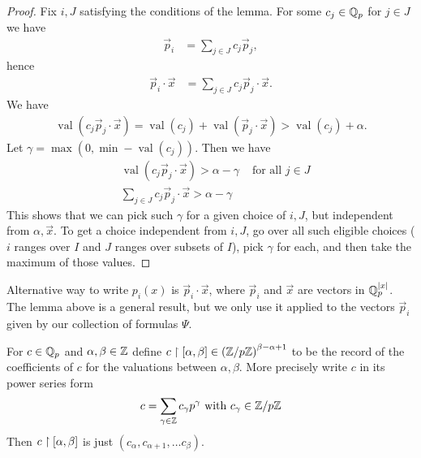 \documentclass{amsart}
\newcommand{\paren}[1]{\left(#1\right)}
\DeclareMathOperator{\val}{val}
\begin{document}
\begin{proof}
  Fix $i, J$ satisfying the conditions of the lemma.
  For some $c_j \in \mathbb{Q}_p$ for $j \in J$ we have
  \begin{align*}
    \vec p_i &= \sum_{j \in J} c_j \vec p_j,
  \end{align*}
  hence
  \begin{align*}
    \vec p_i \cdot \vec x &= \sum_{j \in J} c_j \vec p_j \cdot \vec x.
  \end{align*}
  We have
  \begin{align*}
    \val \paren{c_j \vec p_j \cdot \vec x} = \val \paren{c_j} + \val \paren{\vec p_j \cdot \vec x} > \val \paren{c_j} + \alpha.
  \end{align*}
  Let $\gamma = \max(0, \min -\val \paren{c_j})$.
  Then we have 
  \begin{align*}
    &\val \paren{c_j \vec p_j \cdot \vec x} > \alpha - \gamma &\text{ for all $j \in J$}\\
    &\sum_{j \in J} c_j \vec p_j \cdot \vec x > \alpha - \gamma
  \end{align*}
  This shows that we can pick such $\gamma$ for a given choice of $i, J$, but independent from $\alpha, \vec x$.
  To get a choice independent from $i, J$, go over all such eligible choices 
  ($i$ ranges over $I$ and $J$ ranges over subsets of $I$),
  pick $\gamma$ for each, and then take the maximum of those values.
\end{proof}

Alternative way to write $p_i(x)$ is $\vec p_i \cdot \vec x$,
where $\vec p_i$ and $\vec x$ are vectors in $\mathbb{Q}_p^{|x|}$.
The lemma above is a general result,
but we only use it applied to the vectors $\vec p_i$
given by our collection of formulas $\Psi$.


\begin{Definition}
  For $c \in \mathbb{Q}_p$ and $\alpha, \beta \in \mathbb{Z}$ define $c \midr [\alpha, \beta] \in \paren{\Z/p\Z}^{\beta - \alpha + 1}$
  to be the record of the coefficients of $c$ for the valuations between $\alpha, \beta$.
  More precisely write $c$ in its power series form
  \begin{align*}
    c = \sum_{\gamma \in \mathbb{Z}} c_\gamma p^\gamma \text{ with } c_\gamma \in \mathbb{Z}/p\mathbb{Z}
  \end{align*}
  Then $c \upharpoonright [\alpha, \beta]$ is just $(c_\alpha, c_{\alpha+1}, \ldots c_\beta)$.
\end{Definition}
\end{document}
